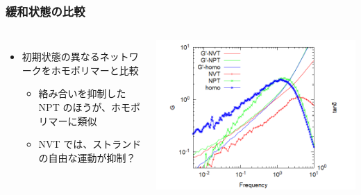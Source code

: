 \documentclass[12pt, dvipdfmx]{beamer}
\begin{document}
\begin{frame}
    \frametitle{緩和状態の比較}

    \begin{columns}[onlytextwidth]
            \begin{itemize}
                \item 初期状態の異なるネットワークをホモポリマーと比較
                \begin{itemize}
                    \item 絡み合いを抑制した NPT のほうが、ホモポリマーに類似
                    \item NVT では、ストランドの自由な運動が抑制？
                \end{itemize}
            \end{itemize}
            \includegraphics[width=\textwidth]{gw_eq.png}
    \end{columns}
\end{frame}
\end{document}
